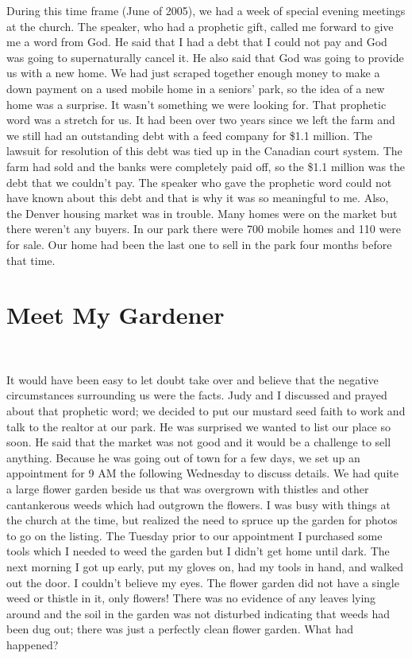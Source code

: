 \documentclass[oneside]{book}
\begin{document}
During this time frame (June of 2005), we had a week of special evening meetings at the church. The speaker, who had a prophetic gift, called me forward to give me a word from God. He said that I had a debt that I could not pay and God was going to supernaturally cancel it. He also said that God was going to provide us with a new home. We had just scraped together enough money to make a down payment on a used mobile home in a seniors' park, so the idea of a new home was a surprise. It wasn't something we were looking for. That prophetic word was a stretch for us. It had been over two years since we left the farm and we still had an outstanding debt with a feed company for \$1.1 million. The lawsuit for resolution of this debt was tied up in the Canadian court system. The farm had sold and the banks were completely paid off, so the \$1.1 million was the debt that we couldn't pay. The speaker who gave the prophetic word could not have known about this debt and that is why it was so meaningful to me. Also, the Denver housing market was in trouble. Many homes were on the market but there weren't any buyers. In our park there were 700 mobile homes and 110 were for sale. Our home had been the last one to sell in the park four months before that time.


\section{Meet My Gardener}
\

It would have been easy to let doubt take over and believe that the negative circumstances   surrounding us were the facts. Judy and I discussed and prayed about that prophetic word; we decided to put our mustard seed faith to work and talk to the realtor at our park. He was surprised we wanted to list our place so soon. He said that the market was not good and it would be a challenge to sell anything. Because he was going out of town for a few days, we set up an appointment for 9 AM the following Wednesday to discuss details. We had quite a large flower garden beside us that was overgrown with thistles and other cantankerous weeds which had outgrown the flowers. I was busy with things at the church at the time, but realized the need to spruce up the garden for photos to go on the listing. The Tuesday prior to our appointment I purchased some tools which I needed to weed the garden but I didn't get home until dark. The next morning I got up early, put my gloves on, had my tools in hand, and walked out the door. I couldn't believe my eyes. The flower garden did not have a single weed or thistle in it, only flowers! There was no evidence of any leaves lying around and the soil in the garden was not disturbed indicating that weeds had been dug out; there was just a perfectly clean flower garden. What had happened?
\end{document}
